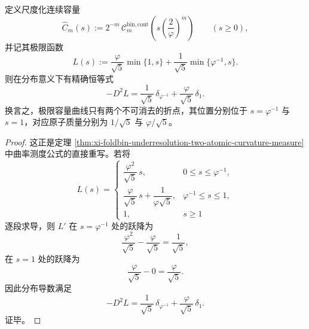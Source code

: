 \begin{theorem}[连续容量极限曲线的分布二阶导数恰为两原子测度]\label{thm:xi-time-part70-continuous-capacity-two-atom-second-derivative}
定义尺度化连续容量
\[
\widehat C_m(s):=
2^{-m}\,\mathcal C_m^{\mathrm{bin,cont}}\!\left(
s\left(\frac{2}{\varphi}\right)^m
\right)
\qquad (s\ge 0),
\]
并记其极限函数
\[
L(s):=\frac{\varphi}{\sqrt5}\min\{1,s\}+\frac{1}{\sqrt5}\min\{\varphi^{-1},s\}.
\]
则在分布意义下有精确恒等式
\[
-D^2L
=
\frac{1}{\sqrt5}\,\delta_{\varphi^{-1}}
+
\frac{\varphi}{\sqrt5}\,\delta_1.
\]
换言之，极限容量曲线只有两个不可消去的折点，其位置分别位于 \(s=\varphi^{-1}\) 与 \(s=1\)，对应原子质量分别为 \(1/\sqrt5\) 与 \(\varphi/\sqrt5\)。
\end{theorem}
\begin{proof}
这正是定理 \ref{thm:xi-foldbin-underresolution-two-atomic-curvature-measure} 中曲率测度公式的直接重写。若将
\[
L(s)=
\begin{cases}
\dfrac{\varphi^2}{\sqrt5}\,s, & 0\le s\le \varphi^{-1},\\[6pt]
\dfrac{\varphi}{\sqrt5}\,s+\dfrac{1}{\varphi\sqrt5}, & \varphi^{-1}\le s\le 1,\\[8pt]
1, & s\ge 1
\end{cases}
\]
逐段求导，则 \(L'\) 在 \(s=\varphi^{-1}\) 处的跃降为
\[
\frac{\varphi^2}{\sqrt5}-\frac{\varphi}{\sqrt5}=\frac{1}{\sqrt5},
\]
在 \(s=1\) 处的跃降为
\[
\frac{\varphi}{\sqrt5}-0=\frac{\varphi}{\sqrt5}.
\]
因此分布导数满足
\[
-D^2L
=
\frac{1}{\sqrt5}\,\delta_{\varphi^{-1}}
+
\frac{\varphi}{\sqrt5}\,\delta_1.
\]
证毕。
\end{proof}

